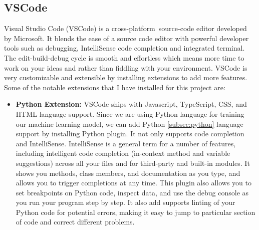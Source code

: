 \subsection{VSCode}
Visual Studio Code (VSCode)\cite{vscode} is a cross-platform source-code editor developed by Microsoft. It blends the ease of a source code editor with powerful developer tools such as debugging, IntelliSense code completion and integrated terminal. The edit-build-debug cycle is smooth and effortless which means more time to work on your ideas and rather than fiddling with your environment. VSCode is very customizable and extensible by installing extensions to add more features. Some of the notable extensions that I have installed for this project are:
\begin{itemize}
  \item \textbf{Python Extension:} VSCode ships with Javascript, TypeScript, CSS, and HTML language support. Since we are using Python language for training our machine learning model, we can add Python \ref{subsec:python} language support by installing Python plugin\cite{vscode_python}. It not only supports code completion and IntelliSense. IntelliSense is a general term for a number of features, including intelligent code completion (in-context method and variable suggestions) across all your files and for third-party and built-in modules. It shows you methods, class members, and documentation as you type, and allows you to trigger completions at any time. This plugin also allows you to set breakpoints on Python code, inspect data, and use the debug console as you run your program step by step. It also add supports linting of your Python code for potential errors, making it easy to jump to particular section of code and correct different problems.


\end{itemize}
